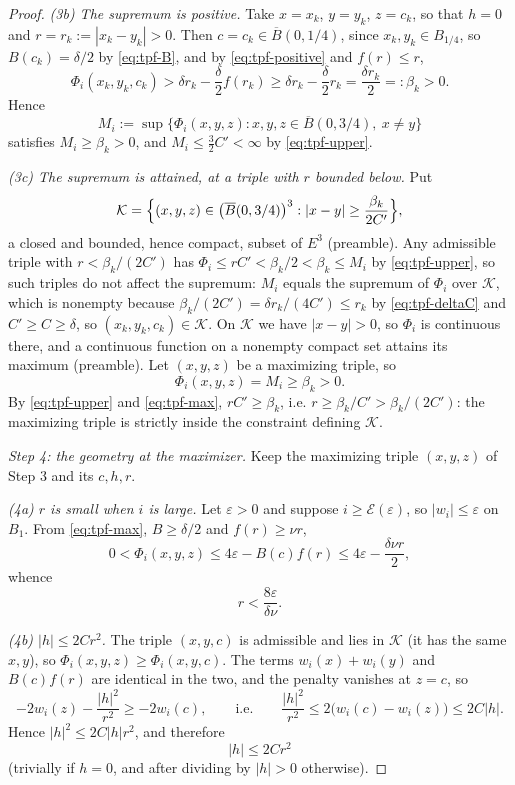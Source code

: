 \begin{proof}
\emph{(3b) The supremum is positive.} Take $x=x_k$, $y=y_k$, $z=c_k$, so that
$h=0$ and $r=r_k:=|x_k-y_k|>0$. Then $c=c_k\in\overline B(0,1/4)$, since
$x_k,y_k\in B_{1/4}$, so $B(c_k)=\delta/2$ by \eqref{eq:tpf-B}, and by
\eqref{eq:tpf-positive} and $f(r)\le r$,
\[
  \Phi_i(x_k,y_k,c_k)>\delta r_k-\frac\delta2 f(r_k)
   \ge\delta r_k-\frac\delta2 r_k=\frac{\delta r_k}{2}=:\beta_k>0 .
\]
Hence
\[
  M_i:=\sup\bigl\{\Phi_i(x,y,z):x,y,z\in\overline B(0,3/4),\ x\ne y\bigr\}
\]
satisfies $M_i\ge\beta_k>0$, and $M_i\le\tfrac32C'<\infty$ by
\eqref{eq:tpf-upper}.

\emph{(3c) The supremum is attained, at a triple with $r$ bounded below.} Put
\[
  \mathcal K=\Bigl\{(x,y,z)\in\bigl(\overline B(0,3/4)\bigr)^3:
    |x-y|\ge\frac{\beta_k}{2C'}\Bigr\},
\]
a closed and bounded, hence compact, subset of $E^3$ (preamble). Any admissible
triple with $r<\beta_k/(2C')$ has $\Phi_i\le rC'<\beta_k/2<\beta_k\le M_i$ by
\eqref{eq:tpf-upper}, so such triples do not affect the supremum: $M_i$ equals
the supremum of $\Phi_i$ over $\mathcal K$, which is nonempty because
$\beta_k/(2C')=\delta r_k/(4C')\le r_k$ by \eqref{eq:tpf-deltaC} and
$C'\ge C\ge\delta$, so $(x_k,y_k,c_k)\in\mathcal K$. On $\mathcal K$ we have
$|x-y|>0$, so $\Phi_i$ is continuous there, and a continuous function on a
nonempty compact set attains its maximum (preamble). Let $(x,y,z)$ be a
maximizing triple, so
\begin{equation}\label{eq:tpf-max}
  \Phi_i(x,y,z)=M_i\ge\beta_k>0 .
\end{equation}
By \eqref{eq:tpf-upper} and \eqref{eq:tpf-max}, $rC'\ge\beta_k$, i.e.
$r\ge\beta_k/C'>\beta_k/(2C')$: the maximizing triple is strictly inside the
constraint defining $\mathcal K$.

\emph{Step 4: the geometry at the maximizer.}
Keep the maximizing triple $(x,y,z)$ of Step 3 and its $c,h,r$.

\emph{(4a) $r$ is small when $i$ is large.} Let $\varepsilon>0$ and suppose
$i\ge\mathcal E(\varepsilon)$, so $|w_i|\le\varepsilon$ on $B_1$. From
\eqref{eq:tpf-max}, $B\ge\delta/2$ and $f(r)\ge\nu r$,
\[
  0<\Phi_i(x,y,z)\le4\varepsilon-B(c)f(r)\le4\varepsilon-\frac{\delta\nu r}{2},
\]
whence
\begin{equation}\label{eq:tpf-rsmall}
  r<\frac{8\varepsilon}{\delta\nu} .
\end{equation}

\emph{(4b) $|h|\le2Cr^2$.} The triple $(x,y,c)$ is admissible and lies in
$\mathcal K$ (it has the same $x,y$), so $\Phi_i(x,y,z)\ge\Phi_i(x,y,c)$. The
terms $w_i(x)+w_i(y)$ and $B(c)f(r)$ are identical in the two, and the penalty
vanishes at $z=c$, so
\[
  -2w_i(z)-\frac{|h|^2}{r^2}\ge-2w_i(c),
  \qquad\text{i.e.}\qquad
  \frac{|h|^2}{r^2}\le2\bigl(w_i(c)-w_i(z)\bigr)\le2C|h| .
\]
Hence $|h|^2\le2C|h|r^2$, and therefore
\begin{equation}\label{eq:tpf-h}
  |h|\le2Cr^2
\end{equation}
(trivially if $h=0$, and after dividing by $|h|>0$ otherwise).


\end{proof}

